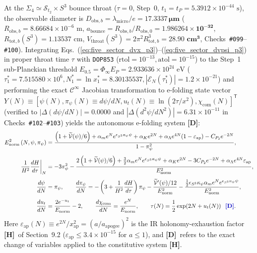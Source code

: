 \documentclass[11pt,a4paper]{article}
\newcommand{\catD}{\textbf{\textcolor{blue!75!black}{[D]}}}
\newcommand{\catH}{\textbf{\textcolor{orange!85!black}{[H]}}}
\theoremstyle{plain}
\theoremstyle{definition}
\theoremstyle{remark}
\numberwithin{equation}{section}
\begin{document}
At the $\Sigma_4 \simeq \mathcal{S}_{t_2} \times S^3$ bounce throat ($\tau = 0$, Step~0, $t_1 = t_P = 5.3912 \times 10^{-44}\text{ s}$), the observable diameter is $D_{\text{obs},b} = \lambda_{\text{micro}}/e = \mathbf{17.3337\,\mu\text{m}}$ ($R_{\text{obs},b} = 8.66684 \times 10^{-6}\text{ m}$, $a_{\text{bounce}} = R_{\text{obs},b}/R_{\text{obs},0} = \mathbf{1.986264 \times 10^{-32}}$, $R_{\text{tot},b}(S^3) = 1.13537\text{ cm}$, $V_{\text{throat}}(S^3) = 2\pi^2 R_{\text{tot},b}^3 = \mathbf{28.90\text{ cm}^3}$, Checks~\texttt{\#099}--\texttt{\#100}). Integrating Eqs.~(\ref{eq:five_sector_dvx_p3})--(\ref{eq:five_sector_dvpsi_p3}) in proper throat time $\tau$ with \texttt{DOP853} ($\text{rtol}=10^{-13}, \text{atol}=10^{-15}$) to the Step~1 sub-Planckian threshold $E_{0.5} = \Phi_{\infty}E_P = 2.933636 \times 10^{24}\text{ eV}$ ($\tau_1^* = 7.515580 \times 10^6, N_1^* = \ln x_1^* = 8.30135537, |\mathcal{E}_N(\tau_1^*)| = 1.2 \times 10^{-21}$) and performing the exact $\mathcal{C}^{\infty}$ Jacobian transformation to e-folding state vector $Y(N) \equiv [\psi(N), \pi_{\psi}(N) \equiv d\psi/dN, u_t(N) \equiv \ln(2\tau/x^2), \chi_{\text{com}}(N)]^{\mathsf{T}}$ (verified to $|\Delta(d\psi/dN)| = 0.0000$ and $|\Delta(d^2\psi/dN^2)| = 6.31 \times 10^{-11}$ in Checks~\texttt{\#102}--\texttt{\#103}) yields the autonomous e-folding system \catD:
\begin{align}
  E_{\text{norm}}^2\left(N, \psi, \pi_{\psi}\right) &= \frac{\left(1 + \widetilde{\mathcal{V}}(\psi)/6\right) + \alpha_m e^N e^{\epsilon_{S^3}\kappa_{\psi}\psi} + \alpha_K e^{2N} + \alpha_{\Lambda}e^{4N}(1 - \varepsilon_{\text{ap}}) - C_{P_2}e^{-2N}}{1 - \pi_{\psi}^2}, \nonumber \\[4pt]
  \left.\frac{1}{H^2}\frac{dH}{d\tau}\right|_N &= -3\pi_{\psi}^2 - \frac{2\left(1 + \widetilde{\mathcal{V}}(\psi)/6\right) + \frac{3}{2}\alpha_m e^N e^{\epsilon_{S^3}\kappa_{\psi}\psi} + \alpha_K e^{2N} - 3 C_{P_2}e^{-2N} + \alpha_{\Lambda}e^{4N}\varepsilon_{\text{ap}}}{E_{\text{norm}}^2}, \nonumber \\[4pt]
  \frac{d\psi}{dN} &= \pi_{\psi}, \qquad \frac{d\pi_{\psi}}{dN} = -\left(3 + \frac{1}{H^2}\frac{dH}{d\tau}\right)\pi_{\psi} - \frac{\widetilde{\mathcal{V}}'(\psi)/12}{E_{\text{norm}}^2} - \frac{\frac{1}{2}\epsilon_{S^3}\kappa_{\psi}\alpha_m e^N e^{\epsilon_{S^3}\kappa_{\psi}\psi}}{E_{\text{norm}}^2}, \nonumber \\[4pt]
  \frac{du_t}{dN} &= \frac{2e^{-u_t}}{E_{\text{norm}}} - 2, \qquad \frac{d\chi_{\text{com}}}{dN} = \frac{e^N}{E_{\text{norm}}}, \qquad \tau(N) = \frac{1}{2}\exp\!\left(2N + u_t(N)\right) \;\;\catD.
  \label{eq:chained_N_ode_system_p3}
\end{align}
Here $\varepsilon_{\text{ap}}(N) \equiv e^{2N}/x_{\text{ap}}^2 = (a/a_{\text{apogee}})^2$ is the IR holonomy-exhaustion factor \catH\ of Section~9.2 ($\varepsilon_{\text{ap}} \le 3.4 \times 10^{-15}$ for $a \le 1$), and \catD\ refers to the exact change of variables applied to the constitutive system \catH.
\end{document}
